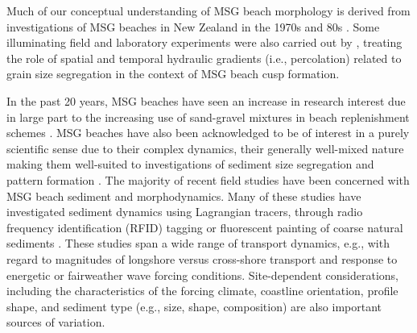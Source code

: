 Much of our conceptual understanding of MSG beach morphology is derived from investigations of MSG beaches in New Zealand in the 1970s and 80s \citep[e.g.,][]{Mclean1970, Kirk1975, Kirk1980, Matthews1983}. Some illuminating field and laboratory experiments were also carried out by \citet{LonguetHiggins_Parkin1962}, treating the role of spatial and temporal hydraulic gradients (i.e., percolation) related to grain size segregation in the context of MSG beach cusp formation. 


In the past 20 years, MSG beaches have seen an increase in research interest due in large part to the increasing use of sand-gravel mixtures in beach replenishment schemes \citep{Mason_Coates2001}. MSG beaches have also been acknowledged to be of interest in a purely scientific sense due to their complex dynamics, their generally well-mixed nature making them well-suited to investigations of sediment size segregation and pattern formation \citep{Hay_etal2014}. The majority of recent field studies have been concerned with MSG beach sediment and morphodynamics. Many of these studies have investigated sediment dynamics using Lagrangian tracers, through radio frequency identification (RFID) tagging \citep{Osborne2005, Allan_etal2006, Curtiss_etal2009, Dickson_etal2011, Miller_etal2011, Miller_Warrick2012, Bertoni_etal2012, Grottoli_etal2015, Grottoli_etal2019} or fluorescent painting of coarse natural sediments \citep{Ciavola_Castiglione2009, Stark_Hay2016}. These studies span a wide range of transport dynamics, e.g., with regard to magnitudes of longshore versus cross-shore transport and response to energetic or fairweather wave forcing conditions. Site-dependent considerations, including the characteristics of the forcing climate, coastline orientation, profile shape, and sediment type (e.g., size, shape, composition) are also important sources of variation.


